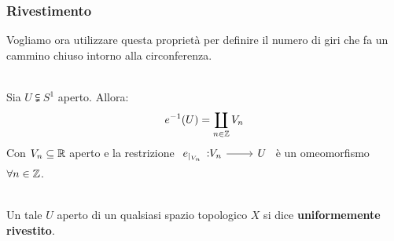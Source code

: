 \subsubsection{Rivestimento}
Vogliamo ora utilizzare questa proprietà per definire il numero di giri che fa un cammino chiuso intorno alla circonferenza.
\begin{lemming}~{}\label{teo uniformemente rivestito}\\
Sia $U\subsetneqq S^1$ aperto. Allora:
	\begin{equation}
		e^{-1}(U) = \coprod_{n\in\mathbb{Z}} V_n
	\end{equation}
Con $V_n\subseteq\mathbb{R}$ aperto e la restrizione $\funz {e_{\mid_{V_n}}} {V_n} U$ è un omeomorfismo $\forall n\in\mathbb{Z}$.
\end{lemming}
\begin{define}~{}\\
	Un tale $U$ aperto di un qualsiasi spazio topologico $X$ si dice \textbf{uniformemente rivestito}.
\end{define}
